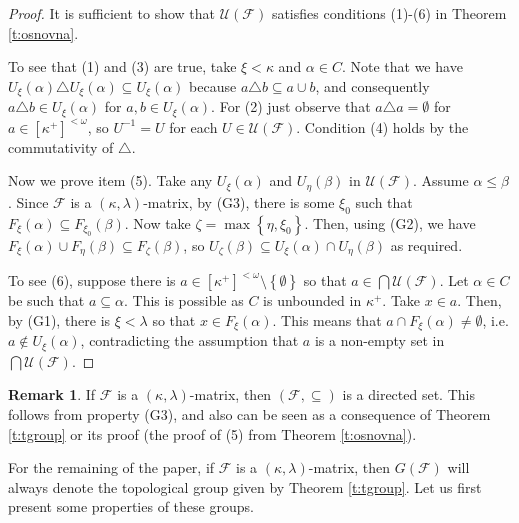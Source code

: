 \documentclass{amsart}
\theoremstyle{plain}
\theoremstyle{definition}
\newtheorem{remark}[theorem]{Remark}
\numberwithin{equation}{section}
\renewcommand{\a}{\alpha}
\renewcommand{\b}{\beta}
\renewcommand{\k}{\kappa}
\renewcommand{\o}{\omega}
\renewcommand{\l}{\lambda}
\newcommand{\ps}{\emptyset}
\newcommand{\sst}{\subseteq}
\newcommand{\cu}{\mathcal U}
\newcommand{\set}[1]{\left\{#1\right\}}
\begin{document}
\begin{proof}
	It is sufficient to show that $\cu(\mathcal F)$ satisfies conditions (1)-(6) in Theorem \ref{t:osnovna}.

    To see that (1) and (3) are true, take $\xi<\k$ and $\a\in C$.
	Note that we have  $U_{\xi}(\a)\triangle U_{\xi}(\a)\sst U_{\xi}(\a)$ because $a\triangle b\sst a\cup b$, and consequently $a\triangle b\in U_{\xi}(\a)$ for $a,b\in U_{\xi}(\a)$.
    For (2) just observe that $a\triangle a=\ps$ for $a\in [\k^+]^{<\o}$, so $U^{-1}=U$ for each $U\in\cu(\mathcal F)$. Condition (4) holds by the commutativity of $\triangle$.
    
    Now we prove item (5).
    Take any $U_{\xi}(\a)$ and $U_{\eta}(\b)$ in $\cu(\mathcal F)$.
    Assume $\a\le\b$.
    Since $\mathcal F$ is a $(\k,\l)$-matrix, by (G3), there is some $\xi_0$ such that $F_{\xi}(\a)\sst F_{\xi_0}(\b)$.
    Now take $\zeta=\max\set{\eta,\xi_0}$.
    Then, using (G2), we have $F_{\xi}(\a)\cup F_{\eta}(\b)\sst F_{\zeta}(\b)$, so $U_{\zeta}(\b)\sst U_{\xi}(\a)\cap U_{\eta}(\b)$ as required.

    To see (6), suppose there is $a\in [\k^+]^{<\o}\setminus\set{\emptyset}$ so that $a\in \bigcap \cu(\mathcal F)$.
    Let $\a\in C$ be such that $a\sst \a$.
	This is possible as $C$ is unbounded in $\k^+$.
    Take $x\in a$.
    Then, by (G1), there is $\xi<\l$ so that $x\in F_{\xi}(\a)$.
	This means that $a\cap F_{\xi}(\a)\neq\ps$, i.e. $a\notin U_{\xi}(\a)$, contradicting the assumption that $a$ is a non-empty set in $\bigcap\cu(\mathcal F)$.
\end{proof}

\begin{remark}\label{r:directed}
	If $\mathcal F$ is a $(\k,\l)$-matrix, then $(\mathcal F,\sst)$ is a directed set.
	This follows from property (G3), and also can be seen as a consequence of Theorem \ref{t:tgroup} or its proof (the proof of (5) from Theorem \ref{t:osnovna}).
\end{remark}

For the remaining of the paper, if $\mathcal F$ is a $(\k,\l)$-matrix, then $G(\mathcal F)$ will always denote the topological group given by Theorem \ref{t:tgroup}.
Let us first present some properties of these groups.
\end{document}
